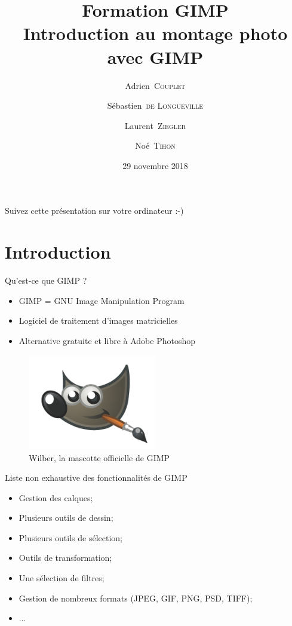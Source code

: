 \documentclass[10pt,svgnames,usenames,table]{beamer}
\institute{Louvain-li-Nux}
\title{\textbf{Formation GIMP}\\
Introduction au montage photo avec GIMP}
\author{Adrien~\textsc{Couplet} \and Sébastien~\textsc{de Longueville} \and Laurent~\textsc{Ziegler} \and Noé~\textsc{Tihon} }
\date{29 novembre 2018}
\begin{document}
\begin{frame}
	\maketitle
\end{frame}

\begin{frame}
  \begin{center}\Large
  Suivez cette présentation sur votre ordinateur :-)
  
  \vspace{1cm}
  \end{center}
\end{frame}

\section{Introduction}
\begin{frame}[allowframebreaks]{Qu'est-ce que GIMP ?}
    \begin{itemize}
        \item GIMP = GNU Image Manipulation Program
        \item Logiciel de traitement d'images matricielles
        \item Alternative gratuite et libre à Adobe Photoshop
    \end{itemize}
    \begin{figure}
        \centering
        \includegraphics[width=0.5\textwidth]{Images/gimp-logo}
        \caption{Wilber, la mascotte officielle de GIMP} 
    \end{figure}
    \framebreak
    Liste non exhaustive des fonctionnalités de GIMP
    \begin{itemize}
        \item Gestion des calques;
        \item Plusieurs outils de dessin;
        \item Plusieurs outils de sélection;
        \item Outils de transformation;
        \item Une sélection de filtres;
        \item Gestion de nombreux formats (JPEG, GIF, PNG, PSD, TIFF);
        \item ...
    \end{itemize}
\end{frame}
\end{document}
